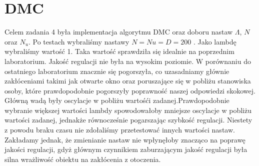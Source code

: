 \chapter{DMC}
Celem zadania 4 była implementacja algorytmu DMC oraz doboru nastaw $\Lambda$, $N$ oraz $N_u$. Po testach wybraliśmy nastawy $N=Nu=D=200$ . Jako lambdę wybraliśmy wartość 1. Taka wartość sprawdziła się idealnie
na poprzednim laboratorium. Jakość regulacji nie była na wysokim poziomie. W porównaniu do ostatniego laboratorium znacznie się pogorszyła, co uzasadniamy głównie zakłóceniami takimi jak
otwarte okno oraz poruszające się w pobliżu stanowiska osoby, które prawdopodobnie
pogorszyły poprawność naszej odpowiedzi skokowej. Główną wadą były oscylacje w pobliżu wartośći zadanej.Prawdopodobnie wybranie większej wartości lambdy spowodowałoby mniejsze oscylacje w pobliżu wartości zadanej,
jednakże równocześnie pogarszając szybkość regulacji. Niestety z powodu braku czasu nie zdołaliśmy przetestować innych wartości nastaw. Zakładamy jednak, że zmienianie nastaw nie wpłynęłoby
znacząco na poprawę jakości regulacji, gdyż głównym czynnikiem zaburzającym jakość regulacji była silna wrażliwość obiektu na zakłócenia z otoczenia.
